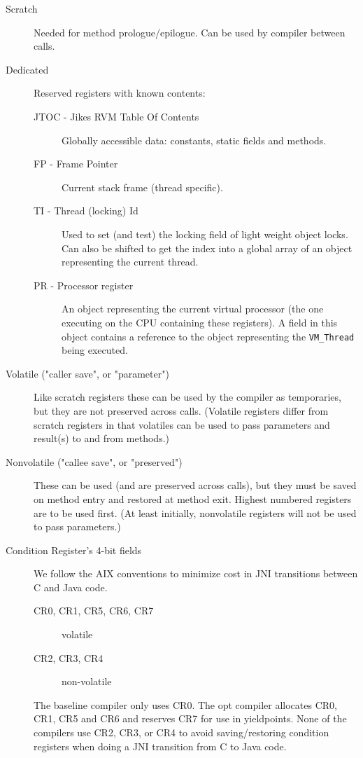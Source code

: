 \begin{description}
\item[Scratch]
     Needed for method prologue/epilogue.  Can be used by compiler between
     calls.

\item[Dedicated]
     Reserved registers with known contents:
\begin{description}
\item[JTOC - Jikes RVM Table Of Contents]
        Globally accessible data: constants, static fields and methods.

\item[FP - Frame Pointer]
        Current stack frame (thread specific).

\item[TI - Thread (locking) Id]
        Used to set (and test) the locking field of light weight object
        locks.  Can also be shifted to get the index into a global
        array of an object representing the current thread.

\item[PR - Processor register]
        An object representing the current virtual processor (the one
        executing on the CPU containing these registers).  A field in
        this object contains a reference to the object representing
        the {\tt VM\_Thread} being executed.
\end{description}

\item[Volatile ("caller save", or "parameter")]
     Like scratch registers these can be used by the compiler as
     temporaries, but they are not preserved across calls.  (Volatile
     registers differ from scratch registers in that volatiles
     can be used to pass parameters and result(s) to and from
     methods.)

\item[Nonvolatile ("callee save", or "preserved")]
     These can be used (and are preserved across calls), but they must be
     saved on method entry and restored at method exit.  Highest numbered
     registers are to be used first.  (At least initially, nonvolatile
     registers will not be used to pass parameters.)

\item[Condition Register's 4-bit fields]
We follow the AIX conventions to minimize cost in JNI transitions
between C and Java code. 
\begin{description}
\item[CR0, CR1, CR5, CR6, CR7] volatile
\item[CR2, CR3, CR4] non-volatile
\end{description}
The baseline compiler only uses CR0.  The opt compiler allocates CR0,
CR1, CR5 and CR6 and reserves CR7 for use in yieldpoints.  None of the
compilers use CR2, CR3, or CR4 to avoid saving/restoring condition
registers when doing a JNI transition from C to Java code. 
\end{description}


